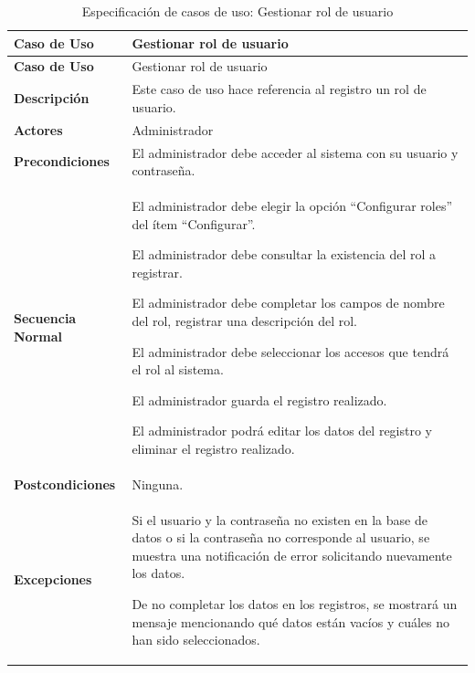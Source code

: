 	\begin{longtable}{m{4cm} m{10.5cm}}
		\caption[Especificación de casos de uso: Gestionar rol de usuario]{\newline Especificación de casos de uso: Gestionar rol de usuario} \label{tab:tabla3_9}\\
		\toprule
		\textbf{Caso de Uso} & Gestionar rol de usuario \\
		\midrule
		\endfirsthead
		
		\toprule
		\textbf{Caso de Uso} & Gestionar rol de usuario \\
		\endhead
		
		
		\bottomrule
		\endlastfoot
		
		\textbf{Descripción} & Este caso de uso hace referencia al registro un rol de usuario. \\ \hline
		\textbf{Actores} & Administrador \\ \hline
		\textbf{Precondiciones} & El administrador debe acceder al sistema con su usuario y contraseña. \\ \hline
		\textbf{Secuencia Normal} & El administrador debe elegir la opción “Configurar roles” del ítem “Configurar”.
		
		El administrador debe consultar la existencia del rol a registrar.
		
		El administrador debe completar los campos de nombre del rol, registrar una descripción del rol.
		
		El administrador debe seleccionar los accesos que tendrá el rol al sistema.
		
		El administrador guarda el registro realizado.
		
		El administrador podrá editar los datos del registro y eliminar el registro realizado. \\ \hline
		\textbf{Postcondiciones} & Ninguna.\\ \hline
		\textbf{Excepciones} & Si el usuario y la contraseña no existen en la base de datos o si la contraseña no corresponde al usuario, se muestra una notificación de error solicitando nuevamente los datos.
		
		De no completar los datos en los registros, se mostrará un mensaje mencionando qué datos están vacíos y cuáles no han sido seleccionados. \\		
	\end{longtable}
	
